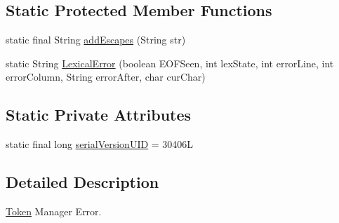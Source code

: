 \subsection*{Static Protected Member Functions}
\begin{DoxyCompactItemize}
\item 
static final String \hyperlink{classuk_1_1ac_1_1manchester_1_1cs_1_1owlapi_1_1dlsyntax_1_1parser_1_1_token_mgr_error_aefd954dfe29eb660807af0128b7a73d0}{add\-Escapes} (String str)
\item 
static String \hyperlink{classuk_1_1ac_1_1manchester_1_1cs_1_1owlapi_1_1dlsyntax_1_1parser_1_1_token_mgr_error_a9537692bee48f85c7749d9cb886ec7c5}{Lexical\-Error} (boolean E\-O\-F\-Seen, int lex\-State, int error\-Line, int error\-Column, String error\-After, char cur\-Char)
\end{DoxyCompactItemize}
\subsection*{Static Private Attributes}
\begin{DoxyCompactItemize}
\item 
static final long \hyperlink{classuk_1_1ac_1_1manchester_1_1cs_1_1owlapi_1_1dlsyntax_1_1parser_1_1_token_mgr_error_a56162b20892ae9a7d51fd3c1e878efa5}{serial\-Version\-U\-I\-D} = 30406\-L
\end{DoxyCompactItemize}


\subsection{Detailed Description}
\hyperlink{classuk_1_1ac_1_1manchester_1_1cs_1_1owlapi_1_1dlsyntax_1_1parser_1_1_token}{Token} Manager Error. 

